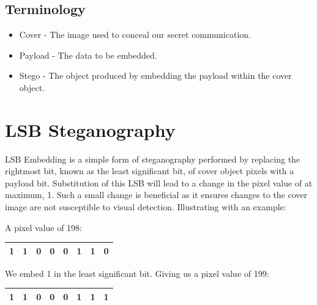 \documentclass{l4proj}
\begin{document}
\subsection{Terminology}
\begin{itemize}
    \item Cover - The image used to conceal our secret communication.
    \item Payload - The data to be embedded.
    \item Stego -  The object produced by embedding the payload within the cover object.
\end{itemize}

\section{LSB Steganography}

LSB Embedding \citep{Morsy} is a simple form of steganography performed by replacing the rightmost bit, known as the least significant bit, of cover object pixels with a payload bit. Substitution of this LSB will lead to a change in the pixel value of at maximum, 1. Such a small change is beneficial as it ensures changes to the cover image are not susceptible to visual detection. Illustrating with an example:

A pixel value of 198:
\begin{table}[!h]
\begin{tabular}{|l|l|l|l|l|l|l|l|}
\hline
1 & 1 & 0 & 0 & 0 & 1 & 1 & 0 \\ \hline
\end{tabular}
\end{table}

We embed 1 in the least significant bit. Giving us a pixel value of 199:

\begin{table}[!h]
\begin{tabular}{|l|l|l|l|l|l|l|l|}
\hline
1 & 1 & 0 & 0 & 0 & 1 & 1 & 1 \\ \hline
\end{tabular}
\end{table}
\end{document}
